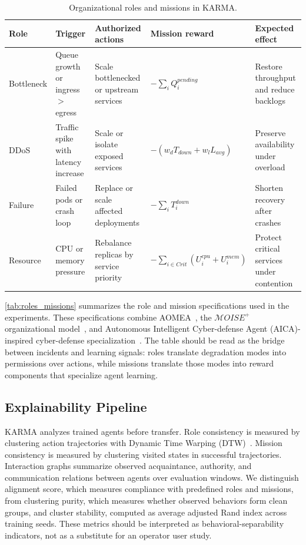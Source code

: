 \documentclass[journal]{IEEEtran}
\begin{document}
\begin{table}[t]
  \centering
  \caption{Organizational roles and missions in KARMA.}
  \label{tab:roles_missions}
  \footnotesize
  \setlength{\tabcolsep}{4pt}
  \renewcommand{\arraystretch}{1.1}
  \begin{tabularx}{\textwidth}{p{2.0cm}p{3.0cm}p{3.1cm}p{3.0cm}X}
    \toprule
    \textbf{Role} & \textbf{Trigger}                    & \textbf{Authorized actions}             & \textbf{Mission reward}                  & \textbf{Expected effect}                   \\
    \midrule
    Bottleneck    & Queue growth or ingress $>$ egress  & Scale bottlenecked or upstream services & $-\sum_i Q_i^{pending}$                  & Restore throughput and reduce backlogs     \\
    DDoS          & Traffic spike with latency increase & Scale or isolate exposed services       & $-(w_d T_{down}+w_l L_{avg})$            & Preserve availability under overload       \\
    Failure       & Failed pods or crash loop           & Replace or scale affected deployments   & $-\sum_i T_i^{down}$                     & Shorten recovery after crashes             \\
    Resource      & CPU or memory pressure              & Rebalance replicas by service priority  & $-\sum_{i\in Crit}(U_i^{cpu}+U_i^{mem})$ & Protect critical services under contention \\
    \bottomrule
  \end{tabularx}
\end{table}

\autoref{tab:roles_missions} summarizes the role and mission specifications used in the experiments. These specifications combine AOMEA~\cite{soule2024aomea}, the $\mathcal{M}OISE^+$ organizational model~\cite{hubner2002moise,Boissier2007OOP}, and Autonomous Intelligent Cyber-defense Agent (AICA)-inspired cyber-defense specialization~\cite{Kott2023}. The table should be read as the bridge between incidents and learning signals: roles translate degradation modes into permissions over actions, while missions translate those modes into reward components that specialize agent learning.

\subsection{Explainability Pipeline}

KARMA analyzes trained agents before transfer. Role consistency is measured by clustering action trajectories with Dynamic Time Warping (DTW)~\cite{berndt1994using}. Mission consistency is measured by clustering visited states in successful trajectories. Interaction graphs summarize observed acquaintance, authority, and communication relations between agents over evaluation windows. We distinguish alignment score, which measures compliance with predefined roles and missions, from clustering purity, which measures whether observed behaviors form clean groups, and cluster stability, computed as average adjusted Rand index across training seeds. These metrics should be interpreted as behavioral-separability indicators, not as a substitute for an operator user study.
\end{document}
